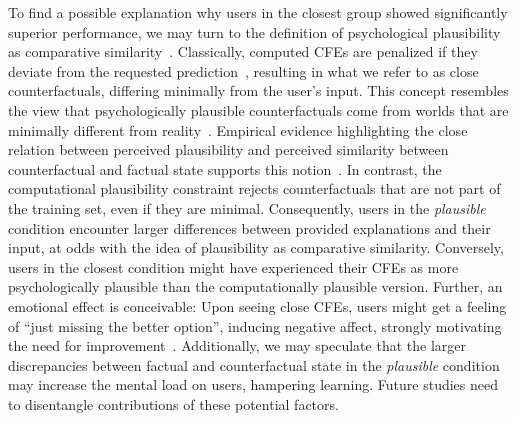 To find a possible explanation why users in the closest group showed significantly superior performance, we may turn to the definition of psychological plausibility as comparative similarity~\citep{lewis_counterfactuals_1973, stanley_counterfactual_2017}. 
Classically, computed CFEs are penalized if they deviate from the requested prediction~\citep{wachter_counterfactual_2017}, resulting in what we refer to as close counterfactuals, differing minimally from the user’s input.
This concept resembles the view that psychologically plausible counterfactuals come from worlds that are minimally different from reality~\citep{lewis_counterfactuals_1973}.
Empirical evidence highlighting the close relation between perceived plausibility and perceived similarity between counterfactual and factual state supports this notion~\citep{stanley_counterfactual_2017, de_brigard_perceived_2021}.
In contrast, the computational plausibility constraint rejects counterfactuals that are not part of the training set, even if they are minimal.
Consequently, users in the \textit{plausible} condition encounter larger differences between provided explanations and their input, at odds with the idea of plausibility as comparative similarity.
Conversely, users in the closest condition might have experienced their \glspl{CFE} as more psychologically plausible than the computationally plausible version.
Further, an emotional effect is conceivable: Upon seeing close \glspl{CFE}, users might get a feeling of ``just missing the better option'', inducing negative affect, strongly motivating the need for improvement~\citep{medvec_when_1997, markman_reflection_2003}.
Additionally, we may speculate that the larger discrepancies between factual and counterfactual state in the \textit{plausible} condition may increase the mental load on users, hampering learning.
Future studies need to disentangle contributions of these potential factors.

